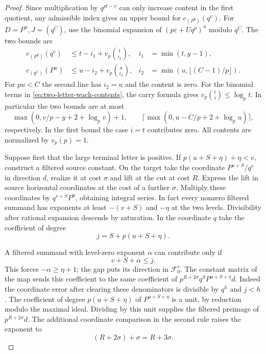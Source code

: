 \begin{proof}
Since multiplication by \(q^{pt-v}\) can only
increase content in the first quotient, any admissible index gives
an upper bound for \(c_{(P^y)}(q^v)\).
For \(D=P^u,J=(q^C)\), use the binomial expansion of
\((p\varepsilon+Uq^p)^u\) modulo \(q^C\). The two bounds are
\begin{equation}\label{eq:two-letter-wach-contents}
 \begin{aligned}
 c_{(P^y)}(q^v)&\le t-i_1+v_p\binom{t}{i_1},
       & i_1&=\min(t,y-1),\\
 c_{(q^C)}(P^u)&\le u-i_2+v_p\binom{u}{i_2},
       & i_2&=\min(u,\lfloor(C-1)/p\rfloor).
 \end{aligned}
\end{equation}
For \(pu<C\) the second line has \(i_2=u\) and the content is zero.
For the binomial terms in \eqref{eq:two-letter-wach-contents}, the carry formula gives \(v_p\binom ti\le\log_p t\).
In particular the two bounds are at most
\[
 \max(0,v/p-y+2+\log_p v)+1,\qquad
 \lceil\max(0,u-C/p+2+\log_p u)\rceil ,
\]
respectively. In the first bound the case \(i=t\) contributes
zero. All contents are normalized by \(v_p(p)=1\).

Suppose first that the large terminal letter is positive. If
\(p(u+S+\eta)+\eta<v\), construct a filtered source constant.
On the target take the coordinate \(P^{u+S}/q^v\) in direction
\(d\), realize it at cost \(\sigma\) and lift at the cut at
cost \(R\). Express the lift in source horizontal coordinates
at the cost of a further \(\sigma\). Multiply these coordinates
by \(q^{v+S}P^\eta\), obtaining integral series. In fact every
nonzero filtered summand has exponents at least \(-(v+S)\)
and \(-\eta\) at the two levels. Divisibility after rational
expansion descends by saturation. In the coordinate \(q\) take
the coefficient of degree
\[
 j=S+p(u+S+\eta).
\]

A filtered summand with level-zero exponent \(\alpha\) can
contribute only if
\[
 v+S+\alpha\le j.
\]
This forces
\(-\alpha\ge\eta+1\); the gap puts its direction in
\(\mathcal F_0^v\). The constant matrix of the map sends this
coefficient to the same coefficient of
\(p^{R+2\sigma}q^S P^{u+S+\eta}d\). Indeed the coordinate error
after clearing these denominators is divisible by \(q^h\) and
\(j<h\). The coefficient of degree \(p(u+S+\eta)\) of
\(P^{u+S+\eta}\) is a unit, by reduction modulo the maximal
ideal. Dividing by this unit supplies the filtered preimage of \(p^{R+2\sigma}d\). The additional coordinate comparison in the second rule raises the exponent to
\[
 (R+2\sigma)+\sigma=R+3\sigma.
\]



\end{proof}

